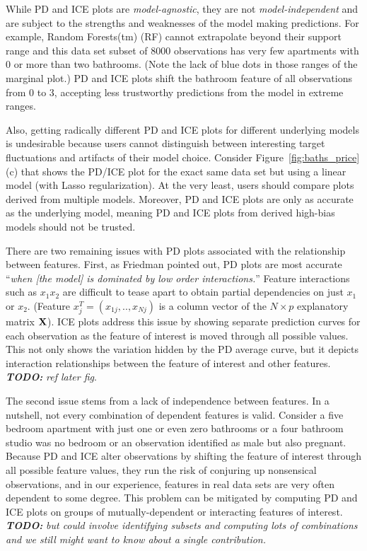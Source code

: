 \documentclass[12pt]{article}
\newcommand{\figref}[1]{Figure~\ref{#1}}
\newcommand{\cut}[1]{}
\newcommand{\todo}[1]{{\bf\em TODO:} {\em #1}}
\begin{document}
\cut{The partial dependence plot broadly follows the marginal plot except for the prices of two and three bathroom apartments, where it levels off. This is counterintuitive and exposes an issue with PD and ICE plots.} While PD and ICE plots are {\em model-agnostic}, they are not {\em model-independent} and are subject to the strengths and weaknesses of the model making predictions.  For example, Random Forests(tm) (RF) cannot extrapolate beyond their support range and this data set subset of 8000 observations has very few apartments with 0 or more than two bathrooms.  (Note the lack of blue dots in those ranges of the marginal plot.) PD and ICE plots shift the bathroom feature of all observations from 0 to 3, accepting less trustworthy predictions from the model in extreme ranges.   

Also, getting radically different PD and ICE plots for different underlying models is undesirable because users cannot distinguish between interesting target fluctuations and artifacts of their model choice. Consider \figref{fig:baths_price}(c) that shows the PD/ICE plot for the exact same data set but using a linear model (with Lasso regularization). At the very least, users should compare plots derived from multiple models. Moreover, PD and ICE plots are only as accurate as the underlying model, meaning PD and ICE plots from derived high-bias models should not be trusted.

There are two remaining issues with PD plots associated with the relationship between features. First, as Friedman pointed out, PD plots are most accurate ``{\em when {\em [the model]} is dominated by low order interactions.}''  Feature interactions such as $x_1x_2$ are difficult to tease apart to obtain partial dependencies on just $x_1$ or $x_2$. (Feature $x_j^T = (x_{1j}, .., x_{Nj})$ is a column vector of the  $N \times p$ explanatory matrix ${\bf X}$). ICE plots address this issue by showing separate prediction curves for each observation as the feature of interest is moved through all possible values.  This not only shows the variation hidden by the PD average curve, but it depicts interaction relationships between the feature of interest and other features. \todo{ref later fig}.

The second issue stems from a lack of independence between features.  In a nutshell, not every combination of dependent features is valid. Consider a five bedroom apartment with just one or even zero bathrooms or a four bathroom studio was no bedroom or an observation identified as male but also pregnant.  Because PD and ICE alter observations by shifting the feature of interest through all possible feature values, they run the risk of conjuring up nonsensical observations, and in our experience, features in real data sets are very often dependent to some degree. This problem can be mitigated by computing PD and ICE plots on groups of mutually-dependent or interacting features of interest. \todo{but could involve identifying subsets and computing lots of combinations and we still might want to know about a single contribution.}
\end{document}

